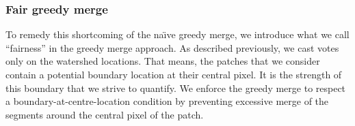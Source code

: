 \subsubsection{Fair greedy merge}
To remedy this shortcoming of the na\"{\i}ve greedy merge, we introduce what we call ``fairness'' in the greedy merge approach. As described previously, we cast votes only on the watershed locations. That means, the patches that we consider contain a potential boundary location at their central pixel. It is the strength of this boundary that we strive to quantify. We enforce the greedy merge to respect a boundary-at-centre-location condition by preventing excessive merge of the segments around the central pixel of the patch.

\begin{figure}[ht!]
\centering

  \qquad\qquad\qquad\qquad\qquad


\end{figure}
